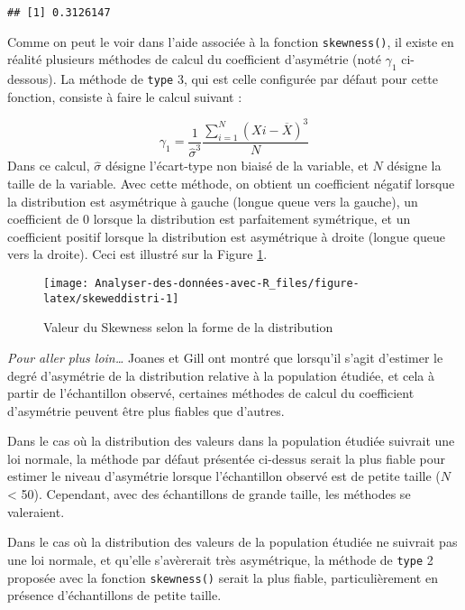 \documentclass[
]{book}
\begin{document}
\begin{verbatim}
## [1] 0.3126147
\end{verbatim}

Comme on peut le voir dans l'aide associée à la fonction \texttt{skewness()}, il existe en réalité plusieurs méthodes de calcul du coefficient d'asymétrie (noté \(\gamma_{1}\) ci-dessous). La méthode de \texttt{type} 3, qui est celle configurée par défaut pour cette fonction, consiste à faire le calcul suivant :

\[\gamma_{1} =  \frac{1}{\hat{\sigma}^3} {\frac{\sum_{i=1}^{N} (X{i} - \overline{X})^3}{N}}\]
Dans ce calcul, \(\hat{\sigma}\) désigne l'écart-type non biaisé de la variable, et \(N\) désigne la taille de la variable. Avec cette méthode, on obtient un coefficient négatif lorsque la distribution est asymétrique à gauche (longue queue vers la gauche), un coefficient de 0 lorsque la distribution est parfaitement symétrique, et un coefficient positif lorsque la distribution est asymétrique à droite (longue queue vers la droite). Ceci est illustré sur la Figure \ref{fig:skeweddistri}.

\begin{figure}

{\centering \texttt{[image: Analyser-des-données-avec-R\_files/figure-latex/skeweddistri-1]} 

}

\caption{Valeur du Skewness selon la forme de la distribution}\label{fig:skeweddistri}
\end{figure}

\emph{Pour aller plus loin\ldots{}}
Joanes et Gill \autocite*{joanesComparingMeasuresSample1998} ont montré que lorsqu'il s'agit d'estimer le degré d'asymétrie de la distribution relative à la population étudiée, et cela à partir de l'échantillon observé, certaines méthodes de calcul du coefficient d'asymétrie peuvent être plus fiables que d'autres.

Dans le cas où la distribution des valeurs dans la population étudiée suivrait une loi normale, la méthode par défaut présentée ci-dessus serait la plus fiable pour estimer le niveau d'asymétrie lorsque l'échantillon observé est de petite taille (\(N\) \textless{} 50). Cependant, avec des échantillons de grande taille, les méthodes se valeraient.

Dans le cas où la distribution des valeurs de la population étudiée ne suivrait pas une loi normale, et qu'elle s'avèrerait très asymétrique, la méthode de \texttt{type} 2 proposée avec la fonction \texttt{skewness()} serait la plus fiable, particulièrement en présence d'échantillons de petite taille.
\end{document}

